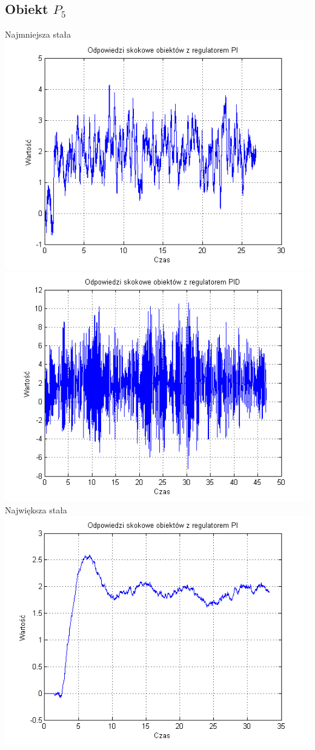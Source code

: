 \documentclass[10pt,a4paper]{article}
\begin{document}
\subsection*{Obiekt $P_5$}
Najmniejsza stała\\
\includegraphics[scale=1]{images/trzy/skrypt_09.png}\\
\includegraphics[scale=1]{images/cztery/skrypt_09.png}\\
Największa stała\\
\includegraphics[scale=1]{images/trzy/skrypt_10.png}\\
\end{document}
